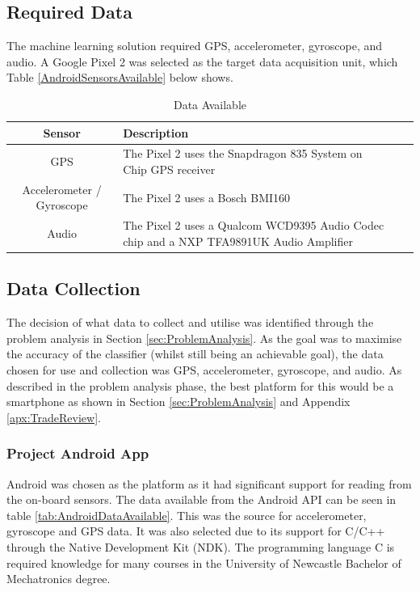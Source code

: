 \documentclass{UoNMCHA}
\newcommand{\sref}[1] {Section \ref{#1}}
\newcommand{\tref}[1] {Table \ref{#1}}
\newcommand{\aref}[1] {Appendix \ref{#1}}
\numberwithin{equation}{section}
\begin{document}
\subsection{Required Data}
The machine learning solution required GPS, accelerometer, gyroscope, and audio. A Google Pixel 2 was selected as the target data acquisition unit, which \tref{AndroidSensorsAvailable} below shows.
\begin{table}[h!] 
    \begin{center}
        \caption{Data Available \cite{pixelteardown}}\label{tab:AndroidSensorsAvailable}
        {\footnotesize
            \begin{tabular}{clll}
                \hline\hline Sensor & Description \\ \hline 
                GPS & The Pixel 2 uses the Snapdragon 835 System on Chip GPS receiver\\
                Accelerometer / Gyroscope & The Pixel 2 uses a Bosch BMI160 \\
                Audio & The Pixel 2 uses a Qualcom WCD9395 Audio Codec chip and a NXP TFA9891UK Audio Amplifier \\ \hline
            \end{tabular}
        }
    \end{center}
\end{table}

\subsection{Data Collection}

The decision of what data to collect and utilise was identified through the problem analysis in \sref{sec:ProblemAnalysis}. As the goal was to maximise the accuracy of the classifier (whilst still being an achievable goal), the data chosen for use and collection was GPS, accelerometer, gyroscope, and audio. As described in the problem analysis phase, the best platform for this would be a smartphone as shown in \sref{sec:ProblemAnalysis} and \aref{apx:TradeReview}. 

\subsubsection{Project Android App}
Android was chosen as the platform as it had significant support for reading from the on-board sensors. The data available from the Android API can be seen in table \ref{tab:AndroidDataAvailable}. This was the source for accelerometer, gyroscope and GPS data. It was also selected due to its support for C/C++ through the Native Development Kit (NDK). The programming language C is required knowledge for many courses in the University of Newcastle Bachelor of Mechatronics degree. 
\end{document}
